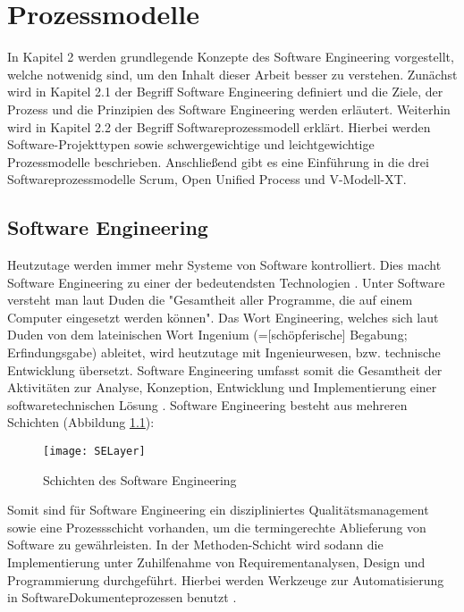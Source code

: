 \chapter{Prozessmodelle}\label{sec:chapter2}

In Kapitel 2 werden grundlegende Konzepte des Software Engineering vorgestellt, welche notwenidg sind, um den Inhalt dieser Arbeit besser zu verstehen. Zunächst wird in Kapitel 2.1 der Begriff Software Engineering definiert und die Ziele, der Prozess und die Prinzipien des Software Engineering werden erläutert. Weiterhin wird in Kapitel 2.2 der Begriff Softwareprozessmodell erklärt. Hierbei werden Software-Projekttypen sowie schwergewichtige und leichtgewichtige Prozessmodelle beschrieben. Anschließend gibt es eine Einführung in die drei Softwareprozessmodelle Scrum, Open Unified Process und V-Modell-XT.

\section{Software Engineering}\label{sec:chapter2: Software Engineering}
Heutzutage werden immer mehr Systeme von Software kontrolliert. Dies macht Software Engineering zu einer der bedeutendsten Technologien \cite{Puntambekar2007}.
Unter Software versteht man laut Duden die "Gesamtheit aller Programme, die auf einem Computer eingesetzt werden können". Das Wort Engineering, welches sich laut Duden von dem lateinischen Wort Ingenium (=[schöpferische] Begabung; Erfindungsgabe) ableitet, wird heutzutage mit Ingenieurwesen, bzw. technische Entwicklung übersetzt. Software Engineering umfasst somit die Gesamtheit der Aktivitäten zur Analyse, Konzeption, Entwicklung und Implementierung einer softwaretechnischen Lösung \cite{Specker1998}.
Software Engineering besteht aus mehreren Schichten (Abbildung \ref{fig:SchichtenSE}):

\begin{figure}[htp]
\begin{center}
  \texttt{[image: SELayer]} %
  \caption{Schichten des Software Engineering \cite{Puntambekar2007}}
  \label{fig:SchichtenSE}
\end{center}
\end{figure}

Somit sind für Software Engineering ein diszipliniertes Qualitätsmanagement sowie eine Prozessschicht vorhanden, um die termingerechte Ablieferung von Software zu gewährleisten. In der Methoden-Schicht wird sodann die Implementierung unter Zuhilfenahme von Requirementanalysen, Design und Programmierung durchgeführt. Hierbei werden Werkzeuge zur Automatisierung in SoftwareDokumenteprozessen benutzt \cite{Puntambekar2007}. 

